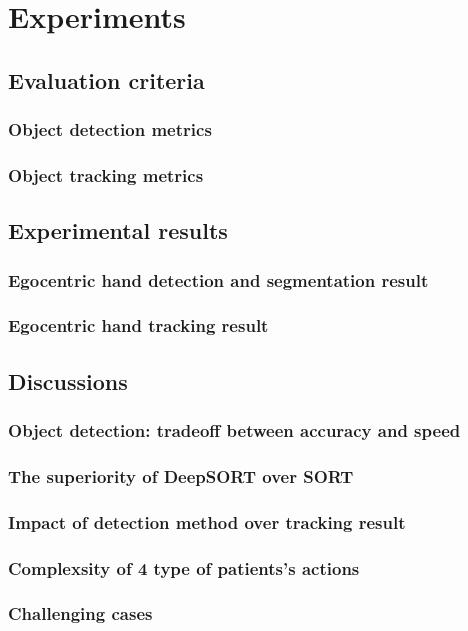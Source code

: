 \chapter{Experiments}

\section{Evaluation criteria}
\subsection{Object detection metrics}
\subsection{Object tracking metrics}
\section{Experimental results}
\subsection{Egocentric hand detection and segmentation result}
\subsection{Egocentric hand tracking result}
\section{Discussions}
\subsection{Object detection: tradeoff between accuracy and speed}
\subsection{The superiority of DeepSORT over SORT}
\subsection{Impact of detection method over tracking result}
\subsection{Complexsity of 4 type of patients’s actions}
\subsection{Challenging cases}